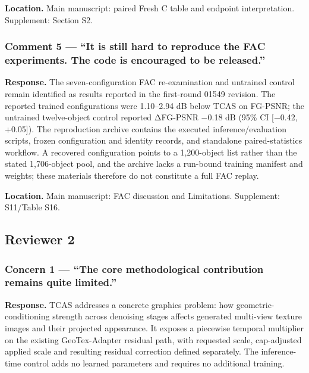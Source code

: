 \documentclass[
  10pt,
]{article}
\begin{document}
\textbf{Location.} Main manuscript: paired Fresh C table and endpoint interpretation. Supplement: Section S2.

\hypertarget{comment-5--it-is-still-hard-to-reproduce-the-fac-experiments-the-code-is-encouraged-to-be-released}{%
\subsubsection{Comment 5 --- ``It is still hard to reproduce the FAC experiments. The code is encouraged to be released.''}\label{comment-5--it-is-still-hard-to-reproduce-the-fac-experiments-the-code-is-encouraged-to-be-released}}

\textbf{Response.} The seven-configuration FAC re-examination and untrained control remain identified as results reported in the first-round 01549 revision. The reported trained configurations were 1.10--2.94 dB below TCAS on FG-PSNR; the untrained twelve-object control reported ΔFG-PSNR −0.18 dB (95\% CI {[}−0.42, +0.05{]}). The reproduction archive contains the executed inference/evaluation scripts, frozen configuration and identity records, and standalone paired-statistics workflow. A recovered configuration points to a 1,200-object list rather than the stated 1,706-object pool, and the archive lacks a run-bound training manifest and weights; these materials therefore do not constitute a full FAC replay.

\textbf{Location.} Main manuscript: FAC discussion and Limitations. Supplement: S11/Table S16.

\hypertarget{reviewer-2}{%
\subsection{Reviewer 2}\label{reviewer-2}}

\hypertarget{concern-1--the-core-methodological-contribution-remains-quite-limited}{%
\subsubsection{Concern 1 --- ``The core methodological contribution remains quite limited.''}\label{concern-1--the-core-methodological-contribution-remains-quite-limited}}

\textbf{Response.} TCAS addresses a concrete graphics problem: how geometric-conditioning strength across denoising stages affects generated multi-view texture images and their projected appearance. It exposes a piecewise temporal multiplier on the existing GeoTex-Adapter residual path, with requested scale, cap-adjusted applied scale and resulting residual correction defined separately. The inference-time control adds no learned parameters and requires no additional training.
\end{document}
